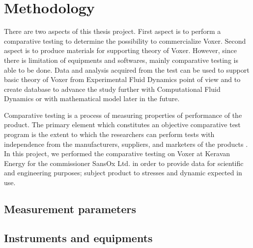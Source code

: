 
\chapter{Methodology}

There are two aspects of this thesis project. First aspect is to perform a comparative testing to determine the possibility to commercialize Voxer. Second aspect is to produce materials for supporting theory of Voxer. However, since there is limitation of equipments and softwares, mainly comparative testing is able to be done. Data and analysis acquired from the test can be used to support basic theory of Voxer from Experimental Fluid Dynamics point of view and to create database to advance the study further with Computational Fluid Dynamics or with mathematical model later in the future.

Comparative testing is a process of measuring properties of performance of the product. The primary element which constitutes an objective comparative test program is the extent to which the researchers can perform tests with independence from the manufacturers, suppliers, and marketers of the products \cite{test:book}. In this project, we performed the comparative testing on Voxer at Keravan Energy for the commissioner SansOx Ltd. in order to provide data for scientific and engineering purposes; subject product to stresses and dynamic expected in use. 

\section{Measurement parameters}

\section{Instruments and equipments}


\clearpage %

